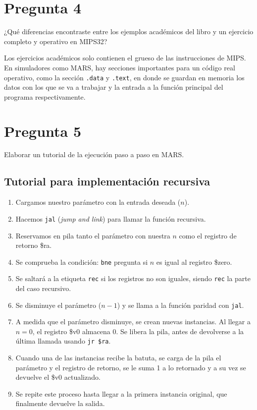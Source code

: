 \documentclass[12pt]{article}
\begin{document}
\section*{Pregunta 4}
¿Qué diferencias encontraste entre los ejemplos académicos del libro y un ejercicio completo y operativo en MIPS32?

Los ejercicios académicos solo contienen el grueso de las instrucciones de MIPS. En simuladores como MARS, hay secciones importantes para un código real operativo, como la sección \texttt{.data} y \texttt{.text}, en donde se guardan en memoria los datos con los que se va a trabajar y la entrada a la función principal del programa respectivamente.

\section*{Pregunta 5}
Elaborar un tutorial de la ejecución paso a paso en MARS.

\subsection*{Tutorial para implementación recursiva}
\begin{enumerate}
    \item Cargamos nuestro parámetro con la entrada deseada ($n$).
    \item Hacemos \texttt{jal} (\textit{jump and link}) para llamar la función recursiva.
    \item Reservamos en pila tanto el parámetro con nuestra $n$ como el registro de retorno \$ra.
    \item Se comprueba la condición: \texttt{bne} pregunta si $n$ es igual al registro \$zero.
    \item Se saltará a la etiqueta \texttt{rec} si los registros no son iguales, siendo \texttt{rec} la parte del caso recursivo.
    \item Se disminuye el parámetro ($n-1$) y se llama a la función paridad con \texttt{jal}.
    \item A medida que el parámetro disminuye, se crean nuevas instancias. Al llegar a $n=0$, el registro \$v0 almacena 0. Se libera la pila, antes de devolverse a la última llamada usando \texttt{jr \$ra}.
    \item Cuando una de las instancias recibe la batuta, se carga de la pila el parámetro y el registro de retorno, se le suma 1 a lo retornado y a su vez se devuelve el \$v0 actualizado.
    \item Se repite este proceso hasta llegar a la primera instancia original, que finalmente devuelve la salida.
\end{enumerate}
\end{document}

